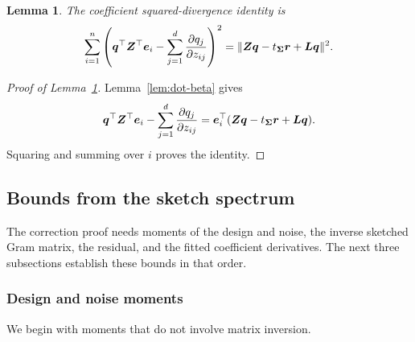 \documentclass{article}
\theoremstyle{plain} %
\newtheorem{lemma}[theorem]{Lemma}
\theoremstyle{definition} %
\theoremstyle{definition} %
\begin{document}
\begin{lemma}\label{lem:dot-hxxh}
The coefficient squared-divergence identity is
\begin{align*}
    \sum_{i=1}^n\left(
       \boldsymbol{q}^\top\boldsymbol{Z}^\top\boldsymbol{e}_i-\sum_{j=1}^d\pdv{q_j}{z_{ij}}
    \right)^2
    =\lVert\boldsymbol{Z}\boldsymbol{q}-t_{\boldsymbol{\Sigma}}\boldsymbol{r}+\boldsymbol{L}\boldsymbol{q}\rVert^2.
\end{align*}
\end{lemma}

\begin{proof}[Proof of Lemma~\ref{lem:dot-hxxh}]
Lemma~\ref{lem:dot-beta} gives
\begin{align*}
    \boldsymbol{q}^\top\boldsymbol{Z}^\top\boldsymbol{e}_i-\sum_{j=1}^d\pdv{q_j}{z_{ij}}
    =\boldsymbol{e}_i^\top(\boldsymbol{Z}\boldsymbol{q}-t_{\boldsymbol{\Sigma}}\boldsymbol{r}+\boldsymbol{L}\boldsymbol{q}).
\end{align*}
Squaring and summing over $i$ proves the identity.
\end{proof}

\subsection{Bounds from the sketch spectrum}
\label{app:auxiliary-lemmas-and-proofs}

The correction proof needs moments of the design and noise, the inverse
sketched Gram matrix, the residual, and the fitted coefficient derivatives.
The next three subsections establish these bounds in that order.

\subsubsection{Design and noise moments}

We begin with moments that do not involve matrix inversion.
\end{document}

